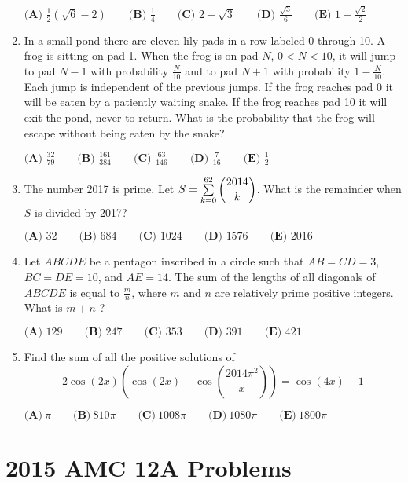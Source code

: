\documentclass{article}
\begin{document}
\begin{enumerate}[label=\arabic*., itemsep=0.5em]
\( \textbf{(A) }\frac{1}{2}(\sqrt{6}-2)\qquad\textbf{(B) }\frac{1}{4}\qquad\textbf{(C) }2-\sqrt{3}\qquad\textbf{(D) }\frac{\sqrt{3}}{6}\qquad\textbf{(E) } 1-\frac{\sqrt{2}}{2}\)\par \vspace{0.5em}\item In a small pond there are eleven lily pads in a row labeled 0 through 10.  A frog is sitting on pad 1.  When the frog is on pad \(N\), \(0<N<10\), it will jump to pad \(N-1\) with probability \(\frac{N}{10}\) and to pad \(N+1\) with probability \(1-\frac{N}{10}\).  Each jump is independent of the previous jumps.  If the frog reaches pad 0 it will be eaten by a patiently waiting snake.  If the frog reaches pad 10 it will exit the pond, never to return.  What is the probability that the frog will escape without being eaten by the snake?

\(\textbf{(A) }\frac{32}{79}\qquad
\textbf{(B) }\frac{161}{384}\qquad
\textbf{(C) }\frac{63}{146}\qquad
\textbf{(D) }\frac{7}{16}\qquad
\textbf{(E) }\frac{1}{2}\qquad\)\par \vspace{0.5em}\item The number 2017 is prime.  Let \(S = \sum \limits_{k=0}^{62} \dbinom{2014}{k}\).  What is the remainder when \(S\) is divided by 2017?

\(\textbf{(A) }32\qquad
\textbf{(B) }684\qquad
\textbf{(C) }1024\qquad
\textbf{(D) }1576\qquad
\textbf{(E) }2016\qquad\)\par \vspace{0.5em}\item Let \(ABCDE\) be a pentagon inscribed in a circle such that \(AB = CD = 3\), \(BC = DE = 10\), and \(AE= 14\).  The sum of the lengths of all diagonals of \(ABCDE\) is equal to \(\frac{m}{n}\), where \(m\) and \(n\) are relatively prime positive integers.  What is \(m+n\) ?

\(\textbf{(A) }129\qquad
\textbf{(B) }247\qquad
\textbf{(C) }353\qquad
\textbf{(D) }391\qquad
\textbf{(E) }421\qquad\)\par \vspace{0.5em}\item Find the sum of all the positive solutions of 
\begin{equation*}
2\cos(2x) \left(\cos(2x) - \cos\left( \frac{2014\pi^2}{x} \right)\right) = \cos(4x) - 1
\end{equation*}


\( \textbf{(A)}\ \pi \qquad\textbf{(B)}\ 810\pi  \qquad\textbf{(C)}\ 1008\pi \qquad\textbf{(D)}\ 1080 \pi \qquad\textbf{(E)}\ 1800\pi \)\par \vspace{0.5em}
\end{enumerate}
\newpage\section*{2015 AMC 12A Problems}
\end{document}
